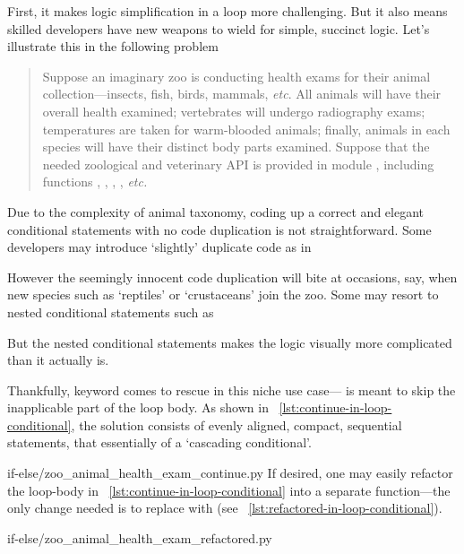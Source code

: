 First, it makes logic simplification in a loop more challenging.
But it also means skilled developers have new weapons to wield for simple, succinct logic.
Let's illustrate this in the following problem
\begin{quote}
    Suppose an imaginary zoo is conducting health exams for their animal collection---insects,
    fish, birds, mammals, \textit{etc}.
    All animals will have their overall health examined;
    vertebrates will undergo radiography exams;
    temperatures are taken for warm-blooded animals;
    finally, animals in each species will have their distinct body parts examined.
    Suppose that the needed zoological and veterinary API is provided in
    module , including functions ,
    , , , \textit{etc.}
\end{quote}


Due to the complexity of animal taxonomy, coding up a correct and elegant conditional statements
with no code duplication is not straightforward.
Some developers may introduce `slightly' duplicate code as in

However the seemingly innocent code duplication will bite at occasions, say,
when new species such as `reptiles' or `crustaceans' join the zoo.
Some may resort to nested conditional statements such as

But the nested conditional statements makes the logic visually more complicated than it actually is.


Thankfully, keyword  comes to rescue in this niche use case---
is meant to skip the inapplicable part of the loop body.
As shown in ~\autoref{lst:continue-in-loop-conditional}, the solution consists of evenly aligned,
compact, sequential statements, that essentially of a `cascading conditional'.

{if-else/zoo_animal_health_exam_continue.py}
If desired, one may easily refactor the loop-body in ~\autoref{lst:continue-in-loop-conditional}
into a separate function---the only change needed is to replace
 with  (see ~\autoref{lst:refactored-in-loop-conditional}).
\begin{clisting}[ht]
    
    {if-else/zoo_animal_health_exam_refactored.py}
\end{clisting}


